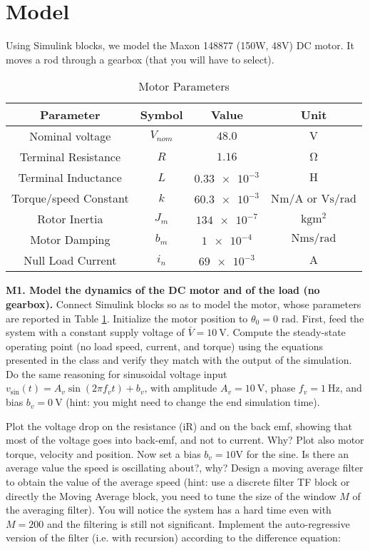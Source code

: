 \documentclass[11pt]{article}
\begin{document}
\section{Model}
Using Simulink blocks, we model the Maxon 148877 (150W, 48V) DC motor. It moves a rod through a gearbox (that you will have to select).
%
\begin{table}[bth]
	\centering
	\begin{tabular}{cccc}
		Parameter       & Symbol      & Value & Unit\\
		\hline \hline
		Nominal voltage & $V_{nom}$ & $48.0$ & $\mathrm{V}$\\
		Terminal Resistance & $R$ & $1.16$ & $\mathrm{\Omega}$ \\
		Terminal Inductance & $L$ & $\num{0.33e-3}$ & $\mathrm{H}$ \\
		Torque/speed Constant & $k$  & $\num{60.3e-3}$ & $\mathrm{Nm/A}$ or $\mathrm{Vs/rad}$ \\
		Rotor Inertia & $J_m$ & $\num{134e-7}$ & $\mathrm{kgm^2}$ \\
		Motor Damping & $b_m$ & $\num{1e-4}$ & $\mathrm{Nms/rad}$ \\
		Null Load Current & $i_n$ & $\num{69e-3}$ & $\mathrm{A}$ 
	\end{tabular}
	\caption{Motor Parameters}
	\label{motor_data}
\end{table}

%
\par
\textbf{M1. Model the dynamics of the DC motor and of the load (no gearbox).} 
Connect Simulink blocks so as to model the motor, whose parameters are reported in Table \ref{motor_data}. 
Initialize the motor position to $\theta_0 = 0$   $\mathrm{rad}$. First, feed the system with a constant supply voltage of $\bar{V} = 10 \ \mathrm{V}$. 
Compute the steady-state operating point (no load speed, current, and torque) using the equations presented in the class and verify they match with the output of the simulation. %
Do the same reasoning for sinusoidal voltage input $v_{\sin} (t) = A_v\sin(2 \pi f_v t)+b_v$, 
with amplitude $A_v = 10 \ \mathrm{V}$, phase $f_v = 1 \ \mathrm{Hz}$, and bias $b_v = 0 \ \mathrm{V}$ (hint: you might need to change the end simulation time).
 
Plot the voltage drop on the resistance (iR) and on the back emf,  
showing that most of the voltage goes into back-emf, and not to current. Why? 
Plot also motor torque, velocity and position. Now set a  bias $b_v = 10 \mathrm{V}$ for the sine. 
Is there an average value the speed is oscillating about?, why? 
Design a moving average filter to obtain the value of the average speed (hint: use a 
discrete filter TF block or directly the Moving Average block, you need to tune the 
size of the window $M$ of the averaging filter). You will notice the system has a hard 
time even with $M = 200$ and the filtering is still not significant. 
Implement the auto-regressive version of the filter (i.e. with recursion) according to the difference equation:
\end{document}
